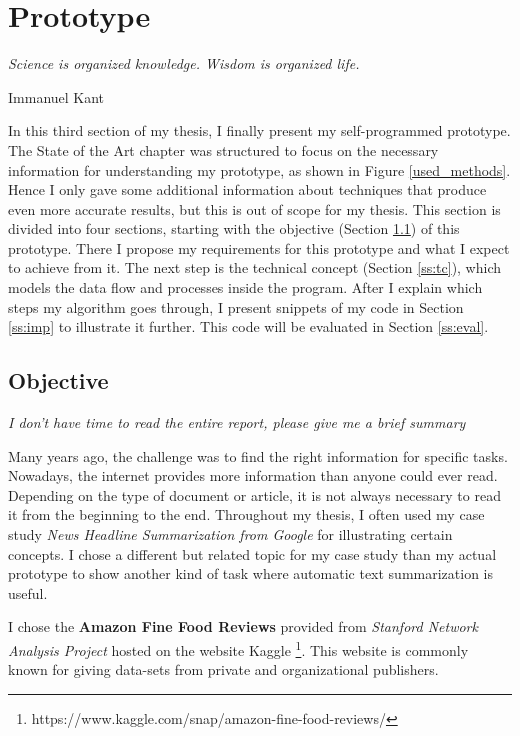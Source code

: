\chapter{Prototype}\label{ch:proto}

\epigraph{\textit{Science is organized knowledge. Wisdom is organized life.}}{Immanuel Kant}

In this third section of my thesis, I finally present my self-programmed prototype. The State of the Art chapter was structured to focus on the necessary information for understanding my prototype, as shown in Figure \ref{used_methods}. Hence I only gave some additional information about techniques that produce even more accurate results, but this is out of scope for my thesis. This section is divided into four sections, starting with the objective (Section \ref{ss:obj}) of this prototype. There I propose my requirements for this prototype and what I expect to achieve from it. The next step is the technical concept (Section \ref{ss:tc}), which models the data flow and processes inside the program. After I explain which steps my algorithm goes through, I present snippets of my code in Section \ref{ss:imp} to illustrate it further. This code will be evaluated in Section \ref{ss:eval}.

\section{Objective}\label{ss:obj}

\begin{tcolorbox}
	\begin{center}
		\textit{I don't have time to read the entire report, please give me a brief summary}
	\end{center}
\end{tcolorbox}

Many years ago, the challenge was to find the right information for specific tasks. Nowadays, the internet provides more information than anyone could ever read. Depending on the type of document or article, it is not always necessary to read it from the beginning to the end. Throughout my thesis, I often used my case study \textit{News Headline Summarization from Google} for illustrating certain concepts. I chose a different but related topic for my case study than my actual prototype to show another kind of task where automatic text summarization is useful.

I chose the \textbf{Amazon Fine Food Reviews} provided from \textit{Stanford Network Analysis Project} hosted on the website Kaggle \footnote{https://www.kaggle.com/snap/amazon-fine-food-reviews/}. This website is commonly known for giving data-sets from private and organizational publishers. 

